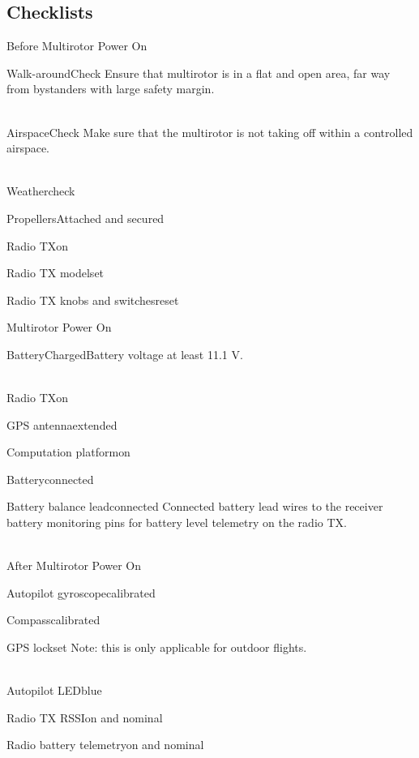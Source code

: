 \subsection{Checklists}
\begin{multicols}{2}

\begin{checklist}{Before Multirotor Power On}
	\item{Walk-around}{Check}
	Ensure that multirotor is in a flat and open area, far way from bystanders with large safety margin.\\\\
	\item{Airspace}{Check}
	Make sure that the multirotor is not taking off within a controlled airspace.\\\\
	\item{Weather}{check}
	\item{Propellers}{Attached and secured}
	\item{Radio TX}{on}
	\item{Radio TX model}{set}
	\item{Radio TX knobs and switches}{reset}
\end{checklist}

\begin{checklist}{Multirotor Power On}
	\item{Battery}{Charged}Battery voltage at least 11.1 V.\\\\
	\item{Radio TX}{on}
	\item{GPS antenna}{extended}
	\item{Computation platform}{on}
	\item{Battery}{connected}
	\item{Battery balance lead}{connected} Connected battery lead wires to the receiver battery monitoring pins for battery level telemetry on the radio TX.\\\\
\end{checklist}

\begin{checklist}{After Multirotor Power On}
	\item{Autopilot gyroscope}{calibrated}
	\item{Compass}{calibrated}
	\item{GPS lock}{set} Note: this is only applicable for outdoor flights.\\\\
	\item{Autopilot LED}{blue}
	\item{Radio TX RSSI}{on and nominal}
	\item{Radio battery telemetry}{on and nominal}
\end{checklist}


\end{multicols}
